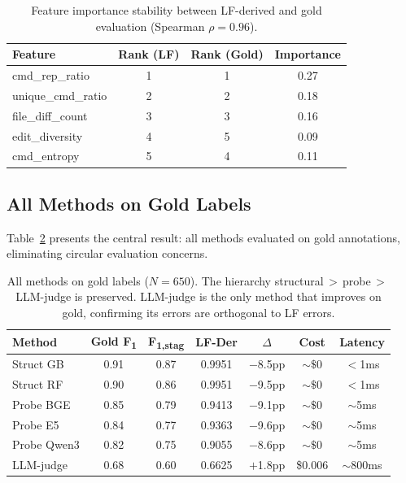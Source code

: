 \documentclass[11pt,a4paper]{article}
\newcommand{\fone}{F\textsubscript{1}}
\newcommand{\fstagone}{F\textsubscript{1,stag}}
\begin{document}
\begin{table}[t]
\centering
\small
\begin{tabular}{lccc}
\toprule
Feature & Rank (LF) & Rank (Gold) & Importance \\
\midrule
cmd\_rep\_ratio & 1 & 1 & 0.27 \\
unique\_cmd\_ratio & 2 & 2 & 0.18 \\
file\_diff\_count & 3 & 3 & 0.16 \\
edit\_diversity & 4 & 5 & 0.09 \\
cmd\_entropy & 5 & 4 & 0.11 \\
\bottomrule
\end{tabular}
\caption{Feature importance stability between LF-derived and gold evaluation (Spearman $\rho{=}0.96$).}
\label{tab:feature-stability}
\end{table}


\subsection{All Methods on Gold Labels}
\label{sec:all-gold}

Table~\ref{tab:all-gold} presents the central result: all methods evaluated on gold annotations, eliminating circular evaluation concerns.

\begin{table}[t]
\centering
\small
\begin{tabular}{lcccccc}
\toprule
Method & Gold \fone{} & \fstagone{} & LF-Der & $\Delta$ & Cost & Latency \\
\midrule
Struct GB & 0.91 & 0.87 & 0.9951 & $-$8.5pp & ${\sim}\$0$ & ${<}$1ms \\
Struct RF & 0.90 & 0.86 & 0.9951 & $-$9.5pp & ${\sim}\$0$ & ${<}$1ms \\
Probe BGE & 0.85 & 0.79 & 0.9413 & $-$9.1pp & ${\sim}\$0$ & ${\sim}$5ms \\
Probe E5 & 0.84 & 0.77 & 0.9363 & $-$9.6pp & ${\sim}\$0$ & ${\sim}$5ms \\
Probe Qwen3 & 0.82 & 0.75 & 0.9055 & $-$8.6pp & ${\sim}\$0$ & ${\sim}$5ms \\
LLM-judge & 0.68 & 0.60 & 0.6625 & $+$1.8pp & \$0.006 & ${\sim}$800ms \\
\bottomrule
\end{tabular}
\caption{All methods on gold labels ($N{=}650$). The hierarchy structural$\,{>}\,$probe$\,{>}\,$LLM-judge is preserved. LLM-judge is the only method that improves on gold, confirming its errors are orthogonal to LF errors.}
\label{tab:all-gold}
\end{table}
\end{document}
